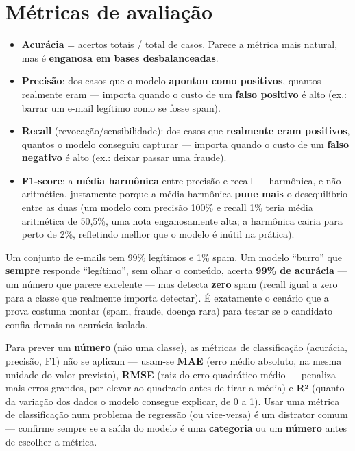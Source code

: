 \section{Métricas de avaliação}

\begin{conceito}
\begin{itemize}
\item \textbf{Acurácia} = acertos totais / total de casos. Parece a
métrica mais natural, mas é \textbf{enganosa em bases desbalanceadas}.
\item \textbf{Precisão}: dos casos que o modelo \textbf{apontou como
positivos}, quantos realmente eram --- importa quando o custo de um
\textbf{falso positivo} é alto (ex.: barrar um e-mail legítimo como se
fosse spam).
\item \textbf{Recall} (revocação/sensibilidade): dos casos que
\textbf{realmente eram positivos}, quantos o modelo conseguiu capturar ---
importa quando o custo de um \textbf{falso negativo} é alto (ex.: deixar
passar uma fraude).
\item \textbf{F1-score}: a \textbf{média harmônica} entre precisão e
recall --- harmônica, e não aritmética, justamente porque a média
harmônica \textbf{pune mais} o desequilíbrio entre as duas (um modelo com
precisão 100\% e recall 1\% teria média aritmética de 50,5\%, uma nota
enganosamente alta; a harmônica cairia para perto de 2\%, refletindo
melhor que o modelo é inútil na prática).
\end{itemize}
\end{conceito}

\begin{exemplo}
Um conjunto de e-mails tem 99\% legítimos e 1\% spam. Um modelo “burro”
que \textbf{sempre} responde “legítimo”, sem olhar o conteúdo, acerta
\textbf{99\% de acurácia} --- um número que parece excelente --- mas
detecta \textbf{zero} spam (recall igual a zero para a classe que
realmente importa detectar). É exatamente o cenário que a prova costuma
montar (spam, fraude, doença rara) para testar se o candidato confia
demais na acurácia isolada.
\end{exemplo}

\begin{conceito}
Para prever um \textbf{número} (não uma classe), as métricas de
classificação (acurácia, precisão, F1) não se aplicam --- usam-se
\textbf{MAE} (erro médio absoluto, na mesma unidade do valor previsto),
\textbf{RMSE} (raiz do erro quadrático médio --- penaliza mais erros
grandes, por elevar ao quadrado antes de tirar a média) e \textbf{R²}
(quanto da variação dos dados o modelo consegue explicar, de 0 a 1). Usar
uma métrica de classificação num problema de regressão (ou vice-versa) é
um distrator comum --- confirme sempre se a saída do modelo é uma
\textbf{categoria} ou um \textbf{número} antes de escolher a métrica.
\end{conceito}

